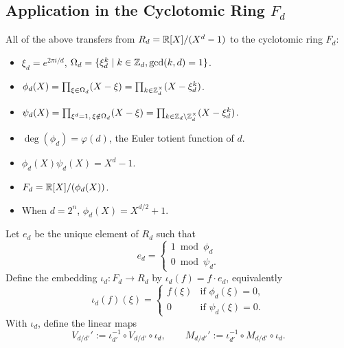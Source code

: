 \subsection{Application in the Cyclotomic Ring \texorpdfstring{$F_d$}{Fd}}

All of the above transfers from $R_d = \mathbb{R}[X]/(X^d-1)$ to the cyclotomic ring $F_d$:
\begin{itemize}
	\item $\xi_d = e^{2\pi i/d}$, $\Omega_d = \{\xi_d^k \mid k \in \mathbb{Z}_d, \gcd(k,d)=1\}$.
	\item $\phi_d(X) = \prod_{\xi \in \Omega_d} (X - \xi) = \prod_{k \in \mathbb{Z}_d^\times} (X - \xi_d^k)$.
	\item $\psi_d(X) = \prod_{\xi^d=1,\, \xi \notin \Omega_d} (X - \xi) = \prod_{k \in \mathbb{Z}_d \setminus \mathbb{Z}_d^\times} (X - \xi_d^k)$.
	\item $\deg(\phi_d) = \varphi(d)$, the Euler totient function of $d$.
	\item $\phi_d(X) \psi_d(X) = X^d - 1$.
	\item $F_d = \mathbb{R}[X]/(\phi_d(X))$.
	\item When $d = 2^n$, $\phi_d(X) = X^{d/2} + 1$.
\end{itemize}

\begin{definition}
	Let $e_d$ be the unique element of $R_d$ such that
	\[
		e_d = \begin{cases} 1 \bmod \phi_d \\ 0 \bmod \psi_d. \end{cases}
	\]
	Define the embedding $\iota_d : F_d \to R_d$ by $\iota_d(f) = f \cdot e_d$, equivalently
	\[
		\iota_d(f)(\xi) = \begin{cases} f(\xi) & \text{if } \phi_d(\xi) = 0, \\ 0 & \text{if } \psi_d(\xi) = 0. \end{cases}
	\]
	With $\iota_d$, define the linear maps
	\[
		V_{d/d'}' := \iota_{d'}^{-1} \circ V_{d/d'} \circ \iota_d, \qquad M_{d/d'}' := \iota_{d'}^{-1} \circ M_{d/d'} \circ \iota_d.
	\]
\end{definition}


\pagebreak

\nocite{*}
\printbibliography


